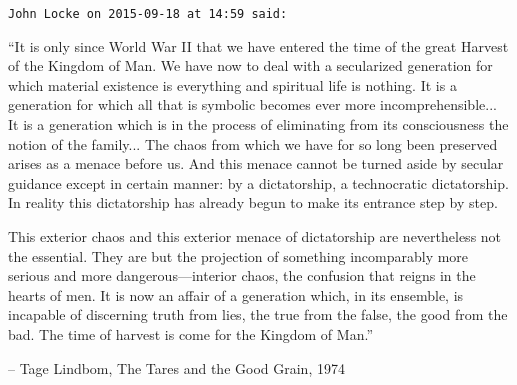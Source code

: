 \begin{footnotesize}
\begin{sffamily}
\hfill

\texttt{John Locke on 2015-09-18 at 14:59 said:}

``It is only since World War II that we have entered the time of the great Harvest of the Kingdom of Man. We have now to deal with a secularized generation for which material existence is everything and spiritual life is nothing. It is a generation for which all that is symbolic becomes ever more incomprehensible... It is a generation which is in the process of eliminating from its consciousness the notion of the family... The chaos from which we have for so long been preserved arises as a menace before us. And this menace cannot be turned aside by secular guidance except in certain manner: by a dictatorship, a technocratic dictatorship. In reality this dictatorship has already begun to make its entrance step by step.

This exterior chaos and this exterior menace of dictatorship are nevertheless not the essential. They are but the projection of something incomparably more serious and more dangerous---interior chaos, the confusion that reigns in the hearts of men. It is now an affair of a generation which, in its ensemble, is incapable of discerning truth from lies, the true from the false, the good from the bad. The time of harvest is come for the Kingdom of Man.''

-- Tage Lindbom, The Tares and the Good Grain, 1974


\hfill

\end{sffamily}
\end{footnotesize}

